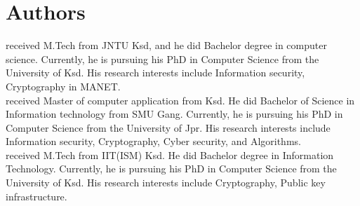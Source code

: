 \documentclass[11pt,a4paper]{llncs}
\begin{document}
\vspace{2cm}

\section*{Authors}
 received M.Tech from JNTU Ksd, and he did Bachelor degree in computer science. Currently, he is pursuing his PhD in Computer Science
from the University of Ksd. His research interests include Information security, Cryptography in MANET.\\

 received Master of computer application from Ksd. He did Bachelor of Science in Information technology from SMU Gang. Currently, he is pursuing his PhD in Computer Science from the University of Jpr. His research interests include Information security, Cryptography, Cyber security, and Algorithms.\\

 received M.Tech from IIT(ISM) Ksd. He did Bachelor degree in Information Technology. Currently, he is pursuing his PhD in Computer Science from the University of Ksd. His research interests include Cryptography, Public key infrastructure.\\
\end{document}
